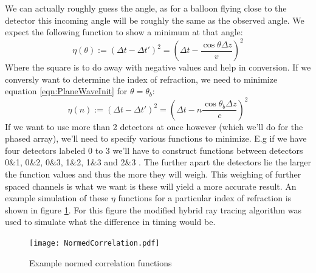We can actually roughly guess the angle, as for a balloon flying close to the
detector this incoming angle will be roughly the same as the observed angle.
We expect the following function to show a minimum at that angle:
\begin{equation}
	\eta(\theta) := (\Delta t - \Delta t')^2 = \left(\Delta t
	- \frac{\cos\theta \Delta z}{v}\right)^2
  	\label{eqn:PlaneWaveInit}
\end{equation}
Where the square is to do away with negative values and help in conversion.
If we conversly want to determine the index of refraction, 
we need to minimize equation \ref{eqn:PlaneWaveInit} for $\theta=\theta_b$:
\begin{equation}
	\eta(n) := (\Delta t - \Delta t')^2 = \left(\Delta t
	- n\frac{\cos\theta_b \Delta z}{c}\right)^2
  	\label{eqn:eta}
\end{equation}
If we want to use more than 2 detectors at once however (which we'll
do for the phased array), we'll need to specify various functions to
minimize.  E.g if we have four detectors labeled 0 to 3 we'll have
to construct functions between detectors 0\&1, 0\&2, 0\&3, 1\&2,
1\&3 and 2\&3 . The further apart the detectors lie the larger the
function values and thus the more they will weigh. This weighing of
further spaced channels is what we want is these will yield a more
accurate result.  An example simulation of these $\eta$ functions
for a particular index of refraction is shown in figure
\ref{fig:NormedCorrelation}.  For this figure the modified hybrid
ray tracing algorithm was used to simulate what the difference in
timing would be.
\begin{figure}
	\centering
	\texttt{[image: NormedCorrelation.pdf]}
	\caption{Example normed correlation functions}
	\label{fig:NormedCorrelation}
\end{figure}
